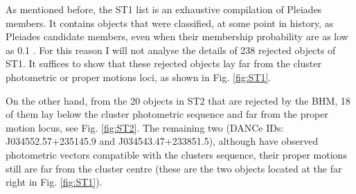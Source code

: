 As mentioned before, the ST1 list is an exhaustive compilation of Pleiades members. It contains objects that were classified, at some point in history, as Pleiades candidate members, even when their membership probability are as low as 0.1 \citep{Stauffer2007}. For this reason I will not analyse the details of 238 rejected objects of ST1. It suffices to show that these rejected objects lay far from the cluster photometric or proper motions loci, as shown in Fig. \ref{fig:ST1}.

On the other hand, from the 20 objects in ST2 that are rejected by the BHM, 18 of them lay below the cluster photometric sequence and far from the proper motion locus, see Fig. \ref{fig:ST2}. The remaining two (DANCe IDs: J034552.57+235145.9 and J034543.47+233851.5), although have observed photometric vectors compatible with the clusters sequence, their proper motions still are far from the cluster centre (these are the two objects located at the far right in Fig. \ref{fig:ST1}).

